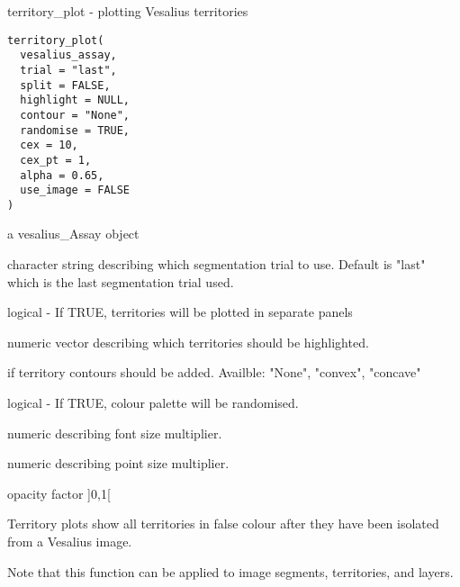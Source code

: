 \documentclass[a4paper]{book}
\begin{document}
%
\begin{Description}
territory\_plot - plotting Vesalius territories
\end{Description}
%
\begin{Usage}
\begin{verbatim}
territory_plot(
  vesalius_assay,
  trial = "last",
  split = FALSE,
  highlight = NULL,
  contour = "None",
  randomise = TRUE,
  cex = 10,
  cex_pt = 1,
  alpha = 0.65,
  use_image = FALSE
)
\end{verbatim}
\end{Usage}
%
\begin{Arguments}
\begin{ldescription}
\item[\code{vesalius\_assay}] a vesalius\_Assay object

\item[\code{trial}] character string describing which segmentation trial
to use. Default is "last" which is the last segmentation trial used.

\item[\code{split}] logical - If TRUE, territories will be plotted in
separate panels

\item[\code{highlight}] numeric vector describing which territories should be 
highlighted.

\item[\code{contour}] if territory contours should be added. Availble:
"None", "convex", "concave"

\item[\code{randomise}] logical - If TRUE, colour palette will be randomised.

\item[\code{cex}] numeric describing font size multiplier.

\item[\code{cex\_pt}] numeric describing point size multiplier.

\item[\code{alpha}] opacity factor ]0,1[
\end{ldescription}
\end{Arguments}
%
\begin{Details}
Territory plots show all territories in false colour after they
have been isolated from a Vesalius image.

Note that this function can be applied to image segments, territories,
and layers.
\end{Details}
\end{document}
